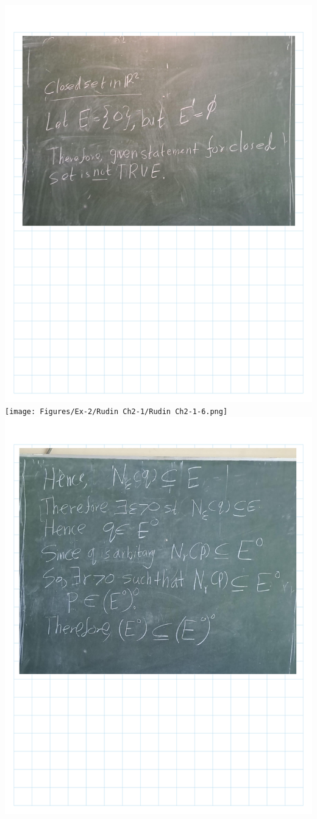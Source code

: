 \documentclass[
]{book}
\theoremstyle{definition}
\theoremstyle{definition}
\theoremstyle{definition}
\theoremstyle{definition}
\theoremstyle{remark}
\begin{document}
\includegraphics{Figures/Ex-2/Rudin Ch2-1/Rudin Ch2-1-5.png}
\texttt{[image: Figures/Ex-2/Rudin Ch2-1/Rudin Ch2-1-6.png]}
\includegraphics{Figures/Ex-2/Rudin Ch2-1/Rudin Ch2-1-7.png}
\end{document}

